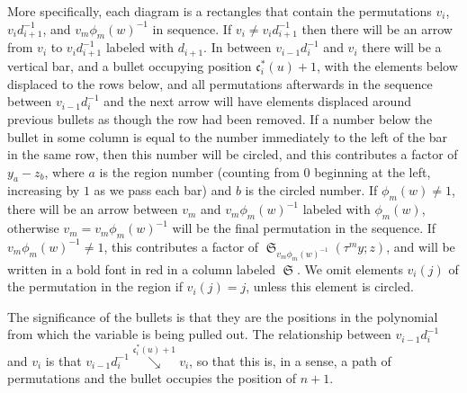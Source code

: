 \documentclass{amsart}
\theoremstyle{definition}
\theoremstyle{remark}
\numberwithin{equation}{subsection}
\DeclareMathOperator{\sch}{\mathfrak{S}}
\newcommand{\downvar}[1]{\stackrel{#1}{\searrow}}
\newcommand{\shifthom}{\tau}
\newcommand{\shiftvby}[1]{\shifthom^{#1}}
\newcommand{\code}{\mathfrak{c}}
\begin{document}
 More specifically, each diagram is a rectangles that contain the permutations $v_i$, $v_id_{i+1}^{-1}$, and $v_m\phi_m(w)^{-1}$ in sequence. If $v_i\neq v_id_{i+1}^{-1}$ then there will be an arrow from $v_i$ to $v_id_{i+1}^{-1}$ labeled with $d_{i+1}$. In between $v_{i-1}d_i^{-1}$ and $v_i$ there will be a vertical bar, and a bullet occupying position $\code_i^*(u)+1$, with the elements below displaced to the rows below, and all permutations afterwards in the sequence between $v_{i-1}d_i^{-1}$ and the next arrow will have elements displaced around previous bullets as though the row had been removed. If a number below the bullet in some column is equal to the number immediately to the left of the bar in the same row, then this number will be circled, and this contributes a factor of $y_a-z_b$, where $a$ is the region number (counting from 0 beginning at the left, increasing by $1$ as we pass each bar) and $b$ is the circled number. If $\phi_m(w)\neq 1$, there will be an arrow between $v_m$ and $v_m\phi_m(w)^{-1}$ labeled with $\phi_m(w)$, otherwise $v_m=v_m\phi_m(w)^{-1}$ will be the final permutation in the sequence. If $v_m\phi_m(w)^{-1}\neq 1$, this contributes a factor of $\sch_{v_m\phi_m(w)^{-1}}(\shiftvby{m}y;z)$, and will be written in a bold font in red in a column labeled $\sch$. We omit elements $v_i(j)$ of the permutation in the region if $v_i(j)=j$, unless this element is circled.

The significance of the bullets is that they are the positions in the polynomial from which the variable is being pulled out. The relationship between $v_{i-1}d_i^{-1}$ and $v_i$ is that $v_{i-1}d_i^{-1}\downvar{\code_i^*(u)+1}v_i$, so that this is, in a sense, a path of permutations and the bullet occupies the position of $n+1$.
\end{document}
